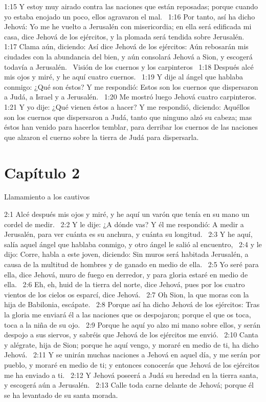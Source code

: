 1:15 Y estoy muy airado contra las naciones que están reposadas; porque cuando yo estaba enojado un poco, ellos agravaron el mal.  
1:16 Por tanto, así ha dicho Jehová: Yo me he vuelto a Jerusalén con misericordia; en ella será edificada mi casa, dice Jehová de los ejércitos, y la plomada será tendida sobre Jerusalén.  
1:17 Clama aún, diciendo: Así dice Jehová de los ejércitos: Aún rebosarán mis ciudades con la abundancia del bien, y aún consolará Jehová a Sion, y escogerá todavía a Jerusalén.  
Visión de los cuernos y los carpinteros  
1:18 Después alcé mis ojos y miré, y he aquí cuatro cuernos.  
1:19 Y dije al ángel que hablaba conmigo: ¿Qué son éstos? Y me respondió: Estos son los cuernos que dispersaron a Judá, a Israel y a Jerusalén.  
1:20 Me mostró luego Jehová cuatro carpinteros.  
1:21 Y yo dije: ¿Qué vienen éstos a hacer? Y me respondió, diciendo: Aquéllos son los cuernos que dispersaron a Judá, tanto que ninguno alzó su cabeza; mas éstos han venido para hacerlos temblar, para derribar los cuernos de las naciones que alzaron el cuerno sobre la tierra de Judá para dispersarla.  
\section*{Capítulo 2 }
Llamamiento a los cautivos  

2:1 Alcé después mis ojos y miré, y he aquí un varón que tenía en su mano un cordel de medir.  
2:2 Y le dije: ¿A dónde vas? Y él me respondió: A medir a Jerusalén, para ver cuánta es su anchura, y cuánta su longitud.  
2:3 Y he aquí, salía aquel ángel que hablaba conmigo, y otro ángel le salió al encuentro,  
2:4 y le dijo: Corre, habla a este joven, diciendo: Sin muros será habitada Jerusalén, a causa de la multitud de hombres y de ganado en medio de ella.  
2:5 Yo seré para ella, dice Jehová, muro de fuego en derredor, y para gloria estaré en medio de ella.  
2:6 Eh, eh, huid de la tierra del norte, dice Jehová, pues por los cuatro vientos de los cielos os esparcí, dice Jehová.  
2:7 Oh Sion, la que moras con la hija de Babilonia, escápate.  
2:8 Porque así ha dicho Jehová de los ejércitos: Tras la gloria me enviará él a las naciones que os despojaron; porque el que os toca, toca a la niña de su ojo.  
2:9 Porque he aquí yo alzo mi mano sobre ellos, y serán despojo a sus siervos, y sabréis que Jehová de los ejércitos me envió.  
2:10 Canta y alégrate, hija de Sion; porque he aquí vengo, y moraré en medio de ti, ha dicho Jehová.  
2:11 Y se unirán muchas naciones a Jehová en aquel día, y me serán por pueblo, y moraré en medio de ti; y entonces conocerás que Jehová de los ejércitos me ha enviado a ti.  
2:12 Y Jehová poseerá a Judá su heredad en la tierra santa, y escogerá aún a Jerusalén.  
2:13 Calle toda carne delante de Jehová; porque él se ha levantado de su santa morada.  
